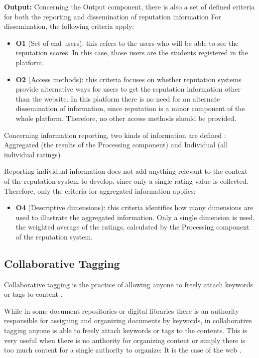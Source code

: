 \documentclass{llncs}
\begin{document}
\textbf{Output:}
Concerning the Output component, there is also a set of defined criteria \cite{liu2012systematic} for both the reporting and dissemination of reputation information
For dissemination, the following criteria apply:
\begin{itemize}
\item \textbf{O1} (Set of end users): this refers to the users who will be able to see the reputation scores. In this case, those users are the students registered in the platform.
\item \textbf{O2} (Access methods): this criteria focuses on whether reputation systems provide alternative ways for users to get the reputation information other than the website. In this platform there is no need for an alternate dissemination of information, since reputation is a minor component of the whole platform. Therefore, no other access methods should be provided.
\end{itemize}
Concerning information reporting, two kinds of information are defined \cite{liu2012systematic}: Aggregated (the results of the Processing component) and Individual (all individual ratings)
 
Reporting individual information does not add anything relevant to the context of the reputation system to develop, since only a single rating value is collected. Therefore, only the criteria for aggregated information applies:
\begin{itemize}
\item \textbf{O4} (Descriptive dimensions): this criteria identifies how many dimensions are used to illustrate the aggregated information. Only a single dimension is used, the weighted average of the ratings, calculated by the Processing component of the reputation system.
\end{itemize}

\subsection{Collaborative Tagging}
Collaborative tagging is the practice of allowing anyone to freely attach keywords or tags to content \cite{golder2006usage}.

While in some document repositories or digital libraries there is an authority responsible for assigning and organizing documents by keywords, in collaborative tagging anyone is able to freely attach keywords or tags to the contents. This is very useful when there is no authority for organizing content or simply there is too much content for a single authority to organize: It is the case of the web \cite{golder2006usage}.
\end{document}
